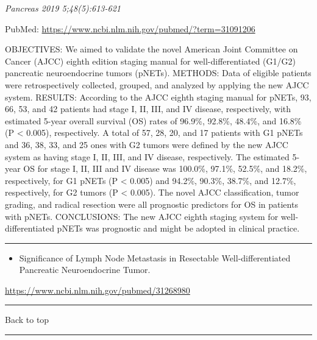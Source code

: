 \documentclass[]{article}
\providecommand{\tightlist}{%
  \setlength{\itemsep}{0pt}\setlength{\parskip}{0pt}}
\begin{document}
\emph{Pancreas 2019 5;48(5):613-621}

PubMed: \url{https://www.ncbi.nlm.nih.gov/pubmed/?term=31091206}

OBJECTIVES: We aimed to validate the novel American Joint Committee on
Cancer (AJCC) eighth edition staging manual for well-differentiated
(G1/G2) pancreatic neuroendocrine tumors (pNETs). METHODS: Data of
eligible patients were retrospectively collected, grouped, and analyzed
by applying the new AJCC system. RESULTS: According to the AJCC eighth
staging manual for pNETs, 93, 66, 53, and 42 patients had stage I, II,
III, and IV disease, respectively, with estimated 5-year overall
survival (OS) rates of 96.9\%, 92.8\%, 48.4\%, and 16.8\% (P \textless{}
0.005), respectively. A total of 57, 28, 20, and 17 patients with G1
pNETs and 36, 38, 33, and 25 ones with G2 tumors were defined by the new
AJCC system as having stage I, II, III, and IV disease, respectively.
The estimated 5-year OS for stage I, II, III and IV disease was 100.0\%,
97.1\%, 52.5\%, and 18.2\%, respectively, for G1 pNETs (P \textless{}
0.005) and 94.2\%, 90.3\%, 38.7\%, and 12.7\%, respectively, for G2
tumors (P \textless{} 0.005). The novel AJCC classification, tumor
grading, and radical resection were all prognostic predictors for OS in
patients with pNETs. CONCLUSIONS: The new AJCC eighth staging system for
well-differentiated pNETs was prognostic and might be adopted in
clinical practice.

{}

{}

\begin{center}\rule{0.5\linewidth}{\linethickness}\end{center}

\begin{itemize}
\tightlist
\item
  Significance of Lymph Node Metastasis in Resectable
  Well-differentiated Pancreatic Neuroendocrine Tumor.
\end{itemize}

\url{https://www.ncbi.nlm.nih.gov/pubmed/31268980}

\begin{center}\rule{0.5\linewidth}{\linethickness}\end{center}

Back to top

\begin{center}\rule{0.5\linewidth}{\linethickness}\end{center}
\end{document}
